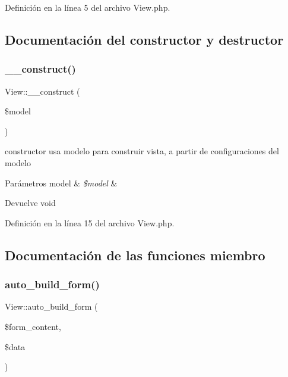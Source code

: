 Definición en la línea 5 del archivo View.\+php.



\subsection{Documentación del constructor y destructor}
\mbox{\label{class_view_a946a646ca1bb866acdbde73a28f33993}} 
\subsubsection{\texorpdfstring{\_\_construct()}{\_\_construct()}}
{\footnotesize\ttfamily View\+::\+\_\+\+\_\+construct (\begin{DoxyParamCaption}\item[{}]{\$model }\end{DoxyParamCaption})}

constructor usa modelo para construir vista, a partir de configuraciones del modelo


\begin{DoxyParams}[1]{Parámetros}
model & {\em \$model} & \\
\hline
\end{DoxyParams}
\begin{DoxyReturn}{Devuelve}
void 
\end{DoxyReturn}


Definición en la línea 15 del archivo View.\+php.



\subsection{Documentación de las funciones miembro}
\mbox{\label{class_view_a450c3cc299b4e42b3e6499b783a3ad6d}} 
\subsubsection{\texorpdfstring{auto\_build\_form()}{auto\_build\_form()}}
{\footnotesize\ttfamily View\+::auto\+\_\+build\+\_\+form (\begin{DoxyParamCaption}\item[{}]{\$form\+\_\+content,  }\item[{}]{\$data }\end{DoxyParamCaption})}

